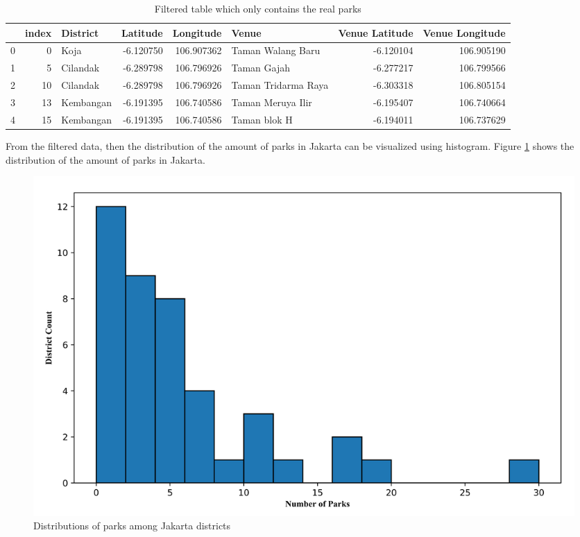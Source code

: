 \begin{table}
\centering
\caption{Filtered table which only contains the real parks}
\label{tab:5}
\begin{adjustbox}{width=\textwidth}
\begin{tabular}{lrlrrlrr}
\toprule
{} &  index &   District &  Latitude &   Longitude &                Venue &  Venue Latitude &  Venue Longitude \\
\midrule
0 &      0 &       Koja & -6.120750 &  106.907362 &    Taman Walang Baru &       -6.120104 &       106.905190 \\
1 &      5 &   Cilandak & -6.289798 &  106.796926 &          Taman Gajah &       -6.277217 &       106.799566 \\
2 &     10 &   Cilandak & -6.289798 &  106.796926 &  Taman Tridarma Raya &       -6.303318 &       106.805154 \\
3 &     13 &  Kembangan & -6.191395 &  106.740586 &    Taman Meruya Ilir &       -6.195407 &       106.740664 \\
4 &     15 &  Kembangan & -6.191395 &  106.740586 &         Taman blok H &       -6.194011 &       106.737629 \\
\bottomrule
\end{tabular}
\end{adjustbox}
\end{table}

\noindent
From the filtered data, then the distribution of the amount of parks in Jakarta can be visualized using histogram. Figure \ref{fig=hist.png} shows the distribution of the amount of parks in Jakarta.\\


\begin{figure}
\begin{center}
\graphicspath{ {./Pict/} }
\includegraphics[scale=0.15]{hist.png}
\caption{Distributions of parks among Jakarta districts}\label{fig=hist.png}
\end{center}
\end{figure}

